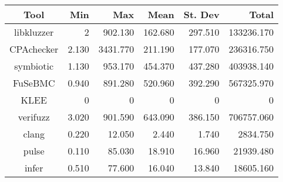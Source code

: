\begin{table}
	\begin{center}
		\begin{tabular}{|c|r|r|r|r|r|}
			\hline
			Tool & Min & Max & Mean & St. Dev & Total \\
			\hline
			libkluzzer & 2 & 902.130 & 162.680 & 297.510 & 133236.170 \\
			\hline
			CPAchecker & 2.130 & 3431.770 & 211.190 & 177.070 & 236316.750 \\
			\hline
			symbiotic & 1.130 & 953.170 & 454.370 & 437.280 & 403938.140 \\
			\hline
			FuSeBMC & 0.940 & 891.280 & 520.960 & 392.290 & 567325.970 \\
			\hline
			KLEE & 0 & 0 & 0 & 0 & 0 \\
			\hline
			verifuzz & 3.020 & 901.590 & 643.090 & 386.150 & 706757.060 \\
			\hline
			clang & 0.220 & 12.050 & 2.440 & 1.740 & 2834.750 \\
			\hline
			pulse & 0.110 & 85.030 & 18.910 & 16.960 & 21939.480 \\
			\hline
			infer & 0.510 & 77.600 & 16.040 & 13.840 & 18605.160 \\
			\hline
		\end{tabular}
	\end{center}
\end{table}